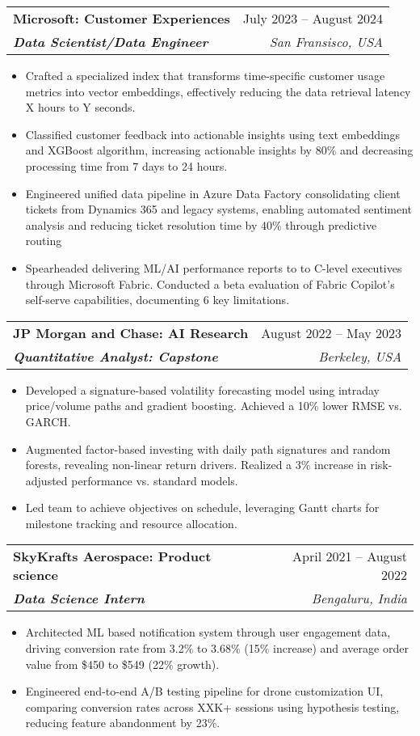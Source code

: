 \documentclass[letterpaper,10pt]{article}
\makeatletter
\newcommand{\resumeItem}[1]{
  \item\small{
    {#1 \vspace{-2pt}}
  }
}
\newcommand{\resumeSubheading}[4]{
  \vspace{-2pt}\item
    \begin{tabular*}{0.97\textwidth}[t]{l@{\extracolsep{\fill}}r}
      \textbf{#1} & #2 \\
      \textit{\small#3} & \textit{\small #4} \\
    \end{tabular*}\vspace{-7pt}
}
\newcommand{\resumeItemListStart}{\begin{itemize}}
\newcommand{\resumeItemListEnd}{\end{itemize}\vspace{-5pt}}
\makeatother
\begin{document}
    \resumeSubheading
      {Microsoft: Customer Experiences}{July 2023 -- August 2024}
      {\textbf{Data Scientist/Data Engineer}}{San Fransisco, USA}
      \resumeItemListStart
        \resumeItem{Crafted a specialized index that transforms time-specific customer usage metrics into vector embeddings, effectively reducing the data retrieval latency X hours to Y seconds.}
        \resumeItem{Classified customer feedback into actionable insights using text embeddings and XGBoost algorithm, increasing actionable insights by 80\% and decreasing processing time from 7 days to 24 hours.}
\resumeItem{Engineered unified data pipeline in Azure Data Factory consolidating client tickets from Dynamics 365 and legacy systems, enabling automated sentiment analysis and reducing ticket resolution time by 40\% through predictive routing}
        \resumeItem{Spearheaded delivering ML/AI performance reports to  to C-level executives through Microsoft Fabric. Conducted a beta evaluation of Fabric Copilot's self-serve capabilities, documenting 6 key limitations.}
      \resumeItemListEnd

    \resumeSubheading
      {JP Morgan and Chase: AI Research}{August 2022 -- May 2023}
      {\textbf{Quantitative Analyst: Capstone}}{Berkeley, USA}
      \resumeItemListStart
        \resumeItem{Developed a signature-based volatility forecasting model using intraday price/volume paths and gradient boosting. Achieved a 10\% lower RMSE vs. GARCH.}
        \resumeItem{Augmented factor-based investing with daily path signatures and random forests, revealing non-linear return drivers. Realized a 3\% increase in risk-adjusted performance vs. standard models.}
        \resumeItem{Led team to achieve objectives on schedule, leveraging Gantt charts for milestone tracking and resource allocation.}

      \resumeItemListEnd

    \resumeSubheading
      {SkyKrafts Aerospace: Product science}{April 2021 -- August 2022}
      {\textbf{Data Science Intern}}{Bengaluru, India}
      \resumeItemListStart
          \resumeItem{Architected ML based notification system through user engagement data, driving conversion rate from 3.2\% to 3.68\% (15\% increase) and average order value from \$450 to \$549 (22\% growth).}

        \resumeItem{Engineered end-to-end A/B testing pipeline for drone customization UI, comparing conversion rates across XXK+ sessions using hypothesis testing, reducing feature abandonment by 23\%.}
      \resumeItemListEnd
\end{document}
